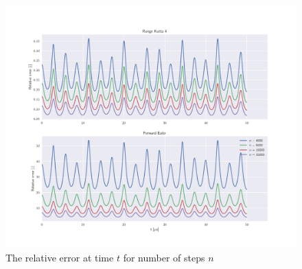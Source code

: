 \begin{figure}
\centering
\includegraphics[scale = 0.7]{../figures/convergence.pdf}
\caption{The relative error at time $t$ for number of steps $n$}
\label{fig:converge}
\end{figure}

